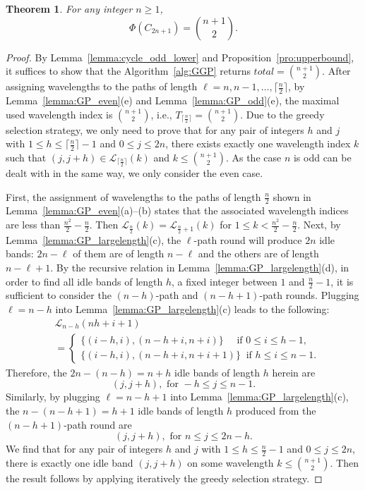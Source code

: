 \documentclass[journal,draftcls,onecolumn,12pt,twoside]{IEEEtran}
\newtheorem{theorem}{\bf Theorem}
\begin{document}
\begin{theorem}\label{th:cycle_odd_optimal}
For any integer $n\geq 1$, $$\Phi(C_{2n+1})= {n+1\choose 2}.$$
\end{theorem}
\begin{proof}
By Lemma~\ref{lemma:cycle_odd_lower} and Proposition~\ref{pro:upperbound}, it suffices to show that the Algorithm~\ref{alg:GGP} returns $total={n+1\choose 2}$.
After assigning wavelengths to the paths of length $\ell=n,n-1,\ldots,\lceil\frac{n}{2}\rceil$, by Lemma~\ref{lemma:GP_even}(e) and Lemma~\ref{lemma:GP_odd}(e), the maximal used wavelength index is ${n+1\choose 2}$, i.e., $T_{\lceil\frac{n}{2}\rceil}={n+1\choose 2}$.
Due to the greedy selection strategy, we only need to prove that for any pair of integers $h$ and $j$ with $1\leq h\leq\lceil\frac{n}{2}\rceil-1$ and $0\leq j\leq 2n$, there exists exactly one wavelength index $k$ such that $(j,j+h)\in\mathcal{L}_{\lceil\frac{n}{2}\rceil}(k)$ and $k\leq {n+1\choose 2}$.
As the case $n$ is odd can be dealt with in the same way, we only consider the even case.

First, the assignment of wavelengths to the paths of length $\frac{n}{2}$ shown in Lemma~\ref{lemma:GP_even}(a)--(b) states that the associated wavelength indices are less than $\frac{n^2}{2}-\frac{n}{2}$.
Then $\mathcal{L}_{\frac{n}{2}}(k)=\mathcal{L}_{\frac{n}{2}+1}(k)$ for $1\leq k<\frac{n^2}{2}-\frac{n}{2}$.
Next, by Lemma~\ref{lemma:GP_largelength}(c), the $\ell$-path round will produce $2n$ idle bands: $2n-\ell$ of them are of length $n-\ell$ and the others are of length $n-\ell+1$.
By the recursive relation in Lemma~\ref{lemma:GP_largelength}(d), in order to find all idle bands of length $h$, a fixed integer between $1$ and $\frac{n}{2}-1$, it is sufficient to consider the $(n-h)$-path and $(n-h+1)$-path rounds.
Plugging $\ell=n-h$ into Lemma~\ref{lemma:GP_largelength}(c) leads to the following:
\begin{align*}
&\mathcal{L}_{n-h}(nh+i+1) \\
&= 
	\begin{cases}
	\{(i-h, i), (n-h+i,n+i)\} \quad \text{ if } 0\leq i\leq h-1, \\
	\{(i-h, i), (n-h+i,n+i+1)\} ~\text{ if } h \leq i \leq n-1.
	\end{cases}
\end{align*}
Therefore, the $2n-(n-h)=n+h$ idle bands of length $h$ herein are $$(j,j+h),  \text{ for } -h \leq j\leq n-1.$$
Similarly, by plugging $\ell=n-h+1$ into Lemma~\ref{lemma:GP_largelength}(c), the $n-(n-h+1)=h+1$ idle bands of length $h$ produced from the $(n-h+1)$-path round are $$(j,j+h), \text{ for } n\leq j\leq 2n-h.$$
We find that for any pair of integers $h$ and $j$ with $1\leq h\leq\frac{n}{2}-1$ and $0\leq j\leq 2n$, there is exactly one idle band $(j,j+h)$ on some wavelength $k\leq {n+1\choose 2}$.
Then the result follows by applying iteratively the greedy selection strategy.
\end{proof}
\end{document}

